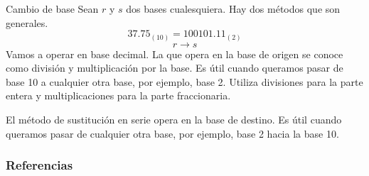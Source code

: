 \documentclass[
	spanish,
	8pt,
	utf8,
	xcolor=table,
	handout,
	aspectratio=169,
	professionalfonts,
	mathserif,
	leqno,
]{beamer}
\begin{document}
\begin{frame}
	\begin{alertblock}{Cambio de base}
		Sean $r$ y $s$ dos bases cualesquiera.
		Hay dos métodos que son generales.
		\begin{equation*}
			37.75_{\left(10\right)} = 100101.11_{\left(2\right)}
		\end{equation*}
		\begin{equation*}
			r\longrightarrow s
		\end{equation*}
		Vamos a operar en base decimal.
		La que opera en la base de origen se conoce como división y multiplicación por la base.
		Es útil cuando queramos pasar de base 10 a cualquier otra base, por ejemplo, base 2.
		Utiliza divisiones para la parte entera y multiplicaciones para la parte fraccionaria.

		El método de sustitución en serie opera en la base de destino.
		Es útil cuando queramos pasar de cualquier otra base, por ejemplo, base 2 hacia la base 10.


	\end{alertblock}
\end{frame}

\begin{frame}\transblindsvertical
	\frametitle{Referencias}
\end{frame}
\end{document}

